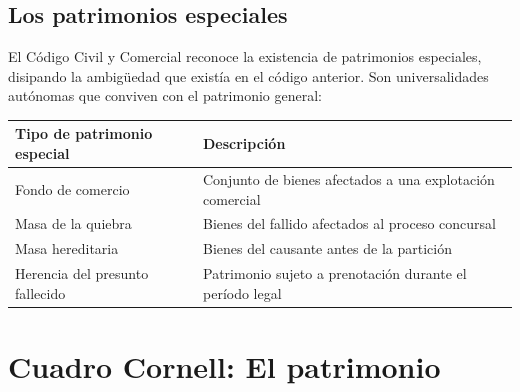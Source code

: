 \documentclass[12pt,oneside]{book}
\newenvironment{tabla}{%
    \par\medskip\begingroup\small\renewcommand{\arraystretch}{1.3}\noindent\ignorespaces
}{%
    \par\endgroup\medskip
}
\begin{document}
\subsection{Los patrimonios especiales}

El Código Civil y Comercial reconoce la existencia de patrimonios especiales, disipando la ambigüedad que existía en el código anterior. Son universalidades autónomas que conviven con el patrimonio general:

\begin{tabla}
\begin{tabularx}{\textwidth}{B{4.6cm}Y}
\toprule
Tipo de patrimonio especial & \textbf{Descripción} \\
\midrule
Fondo de comercio & Conjunto de bienes afectados a una explotación comercial \\
Masa de la quiebra & Bienes del fallido afectados al proceso concursal \\
Masa hereditaria & Bienes del causante antes de la partición \\
Herencia del presunto fallecido & Patrimonio sujeto a prenotación durante el período legal \\
\bottomrule
\end{tabularx}
\end{tabla}

\section{Cuadro Cornell: El patrimonio}
\end{document}
